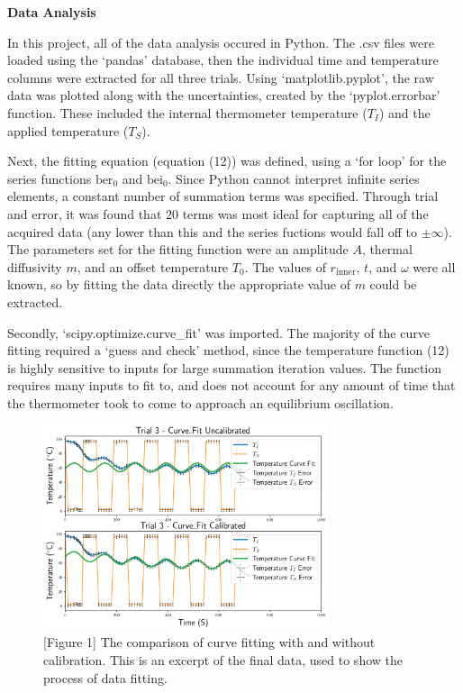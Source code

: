 \documentclass[11pt]{article}
\begin{document}
\begin{multicols}{2}
    \vspace{10pt}

     \selectfont \textbf{Data Analysis}
    
     \selectfont In this project, all of the data analysis occured in Python. The .csv files were loaded using the `pandas' database, then the individual time and temperature columns were extracted for all three trials. Using `matplotlib.pyplot', the raw data was plotted along with the uncertainties, created by the `pyplot.errorbar' function. These included the internal thermometer temperature ($T_I$) and the applied temperature ($T_S$). 

    Next, the fitting equation (equation (12)) was defined, using a `for loop' for the series functions $\text{ber}_0$ and $\text{bei}_0$. Since Python cannot interpret infinite series elements, a constant number of summation terms was specified. Through trial and error, it was found that $20$ terms was most ideal for capturing all of the acquired data (any lower than this and the series fuctions would fall off to $\pm\infty$). The parameters set for the fitting function were an amplitude $A$, thermal diffusivity $m$, and an offset temperature $T_0$. The values of $r_{\text{inner}}$, $t$, and $\omega$ were all known, so by fitting the data directly the appropriate value of $m$ could be extracted.   

    Secondly, `scipy.optimize.curve\_fit' was imported. The majority of the curve fitting required a `guess and check' method, since the temperature function (12) is highly sensitive to inputs for large summation iteration values. The function requires many inputs to fit to, and does not account for any amount of time that the thermometer took to come to approach an equilibrium oscillation. 
    
    \begin{figure}[H]
        \includegraphics[width=3.3in]{calibration comparison.png}
        \caption*{[Figure 1] The comparison of curve fitting with and without calibration. This is an excerpt of the final data, used to show the process of data fitting.}
    \end{figure}


\end{multicols}
\end{document}
